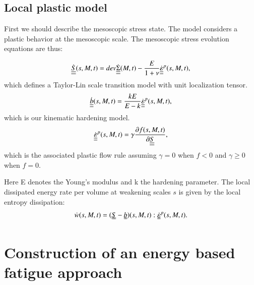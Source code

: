 \documentclass[3p,times,number,review]{elsarticle}
\begin{document}
\subsection{Local plastic model}
First we should describe the mesoscopic stress state.  The model considers a plastic 
behavior at the mesoscopic scale. The mesoscopic stress evolution equations are thus:

 
	\begin{equation}
    \dot{\uline{\uline{S}}}(s,M,t)=dev\dot{\uline{\uline{\Sigma}}}(M,t)-\dfrac{E}{1+\nu}\dot{\uline{\uline{\varepsilon}}}^p(s,M,t), 
	\end{equation}
     which defines a Taylor-Lin scale transition model with unit localization tensor\cite{Bosia201239}.
		\begin{equation}
		\dot{\uline{\uline{b}}}(s,M,t)=\dfrac{kE}{E-k} \dot{\uline{\uline{\varepsilon}}}^p(s,M,t), 
		\end{equation}
		which is our kinematic hardening model.
		\begin{equation}
		\dot{\uline{\uline{\varepsilon}}}^p(s,M,t)=\gamma\dfrac{\partial f(s,M,t)}{\partial \uline{\uline{S}}}, 
		\end{equation}
		which is the associated plastic flow rule assuming $\gamma=0$ when $f<0$ and  $\gamma\geqslant0$ when $f=0$.

Here E denotes the Young's modulus and k the hardening parameter. The local dissipated energy rate per volume at weakening scales $s$  is given by the local entropy dissipation:
\begin{equation}
	\dot{w}(s,M,t)=(\uuline{S}-\uuline{b})(s,M,t):\uuline{\dot{\varepsilon}}^p(s,M,t).
	\label{dissipated}
\end{equation}

\section{Construction of an energy based fatigue approach}
\end{document}
